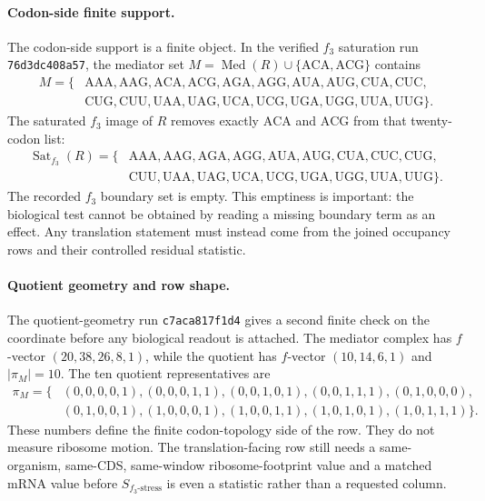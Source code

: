 \paragraph{Codon-side finite support.}
The codon-side support is a finite object.  In the verified $f_3$ saturation run \texttt{76d3dc408a57}, the mediator set $M=\operatorname{Med}(R)\cup\{\mathrm{ACA},\mathrm{ACG}\}$ contains
$$
\begin{aligned}
M=\{&\mathrm{AAA},\mathrm{AAG},\mathrm{ACA},\mathrm{ACG},\mathrm{AGA},\mathrm{AGG},\mathrm{AUA},\mathrm{AUG},\mathrm{CUA},\mathrm{CUC},\\
&\mathrm{CUG},\mathrm{CUU},\mathrm{UAA},\mathrm{UAG},\mathrm{UCA},\mathrm{UCG},\mathrm{UGA},\mathrm{UGG},\mathrm{UUA},\mathrm{UUG}\}.
\end{aligned}
$$
The saturated $f_3$ image of $R$ removes exactly $\mathrm{ACA}$ and $\mathrm{ACG}$ from that twenty-codon list:
$$
\begin{aligned}
\operatorname{Sat}_{f_3}(R)=\{&\mathrm{AAA},\mathrm{AAG},\mathrm{AGA},\mathrm{AGG},\mathrm{AUA},\mathrm{AUG},\mathrm{CUA},\mathrm{CUC},\mathrm{CUG},\\
&\mathrm{CUU},\mathrm{UAA},\mathrm{UAG},\mathrm{UCA},\mathrm{UCG},\mathrm{UGA},\mathrm{UGG},\mathrm{UUA},\mathrm{UUG}\}.
\end{aligned}
$$
The recorded $f_3$ boundary set is empty.  This emptiness is important: the biological test cannot be obtained by reading a missing boundary term as an effect.  Any translation statement must instead come from the joined occupancy rows and their controlled residual statistic.

\paragraph{Quotient geometry and row shape.}
The quotient-geometry run \texttt{c7aca817f1d4} gives a second finite check on the coordinate before any biological readout is attached.  The mediator complex has $f$-vector $(20,38,26,8,1)$, while the quotient has $f$-vector $(10,14,6,1)$ and $|\pi_M|=10$.  The ten quotient representatives are
$$
\begin{aligned}
\pi_M=\{&(0,0,0,0,1),(0,0,0,1,1),(0,0,1,0,1),(0,0,1,1,1),(0,1,0,0,0),\\
&(0,1,0,0,1),(1,0,0,0,1),(1,0,0,1,1),(1,0,1,0,1),(1,0,1,1,1)\}.
\end{aligned}
$$
These numbers define the finite codon-topology side of the row.  They do not measure ribosome motion.  The translation-facing row still needs a same-organism, same-CDS, same-window ribosome-footprint value and a matched mRNA value before $S_{f_3\text{-stress}}$ is even a statistic rather than a requested column.

